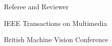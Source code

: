 

\begin{cventries}

  \cventry
    {Referee and Reviewer} %
    {} %
    {} %
    {} %
    {
      \begin{cvitems} %
        \item {IEEE Transactions on Multimedia}
        \item {British Machine Vision Conference}
      \end{cvitems}
    }

\end{cventries}
